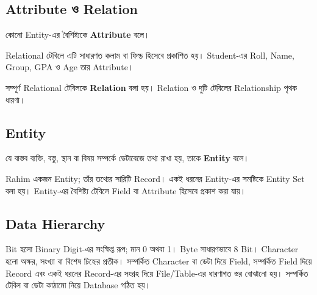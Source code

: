 \begin{flushleft}\centering\captionsetup{justification=centering}
\end{flushleft}

\subsection{Attribute ও Relation}
\begin{definitionbox}{}
কোনো Entity-এর বৈশিষ্ট্যকে \textbf{Attribute} বলে।
\end{definitionbox}
Relational টেবিলে এটি সাধারণত কলাম বা ফিল্ড হিসেবে প্রকাশিত হয়। Student-এর Roll, Name, Group, GPA ও Age তার Attribute।

সম্পূর্ণ Relational টেবিলকে \textbf{Relation} বলা হয়। Relation ও দুটি টেবিলের Relationship পৃথক ধারণা।

\subsection{Entity}
\begin{definitionbox}{}
যে বাস্তব ব্যক্তি, বস্তু, স্থান বা বিষয় সম্পর্কে ডেটাবেজে তথ্য রাখা হয়, তাকে \textbf{Entity} বলে।
\end{definitionbox}
Rahim একজন Entity; তাঁর তথ্যের সারিটি Record। একই ধরনের Entity-এর সমষ্টিকে Entity Set বলা হয়। Entity-এর বৈশিষ্ট্য টেবিলে Field বা Attribute হিসেবে প্রকাশ করা যায়।

\subsection{Data Hierarchy}
Bit হলো Binary Digit-এর সংক্ষিপ্ত রূপ; মান 0 অথবা 1। Byte সাধারণভাবে 8 Bit। Character হলো অক্ষর, সংখ্যা বা বিশেষ চিহ্নের প্রতীক। সম্পর্কিত Character বা ডেটা দিয়ে Field, সম্পর্কিত Field দিয়ে Record এবং একই ধরনের Record-এর সংগ্রহ দিয়ে File/Table-এর ধারণাগত স্তর বোঝানো হয়। সম্পর্কিত টেবিল বা ডেটা কাঠামো নিয়ে Database গঠিত হয়।

